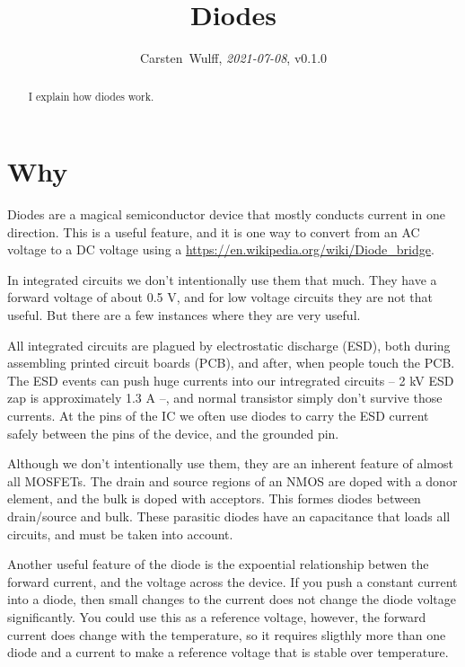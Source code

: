 \documentclass[technote,10pt,a4paper]{IEEEtran}
\begin{document}

\title{Diodes}
\author{Carsten~Wulff, \textit{2021-07-08}, v0.1.0 }
\maketitle

\begin{abstract}
I explain how diodes work.
\end{abstract}

\section{Why}
Diodes are a magical semiconductor device that mostly conducts current in one
direction. This is a useful feature, and it is one way to convert from an AC
voltage to a DC voltage using a
\url{https://en.wikipedia.org/wiki/Diode_bridge}.

In integrated circuits we don't intentionally use them that much. They have a forward voltage
of about 0.5 V, and for low voltage circuits they are not that useful. But there
are a few instances where they are very useful.

All integrated circuits are plagued by electrostatic discharge (ESD), both during
assembling printed circuit boards (PCB), and after, when people touch the PCB.
The ESD events can push huge currents into our intregrated circuits -- 2 kV ESD
zap is approximately 1.3 A --, and normal transistor simply don't survive those
currents. At the pins of the IC we often use diodes to carry the ESD current
safely between the pins of the device, and the grounded pin.

Although we don't intentionally use them, they are an inherent feature of almost
all MOSFETs. The drain and source regions of an NMOS are doped with a donor element, and
the bulk is doped with acceptors. This formes diodes between drain/source and
bulk. These parasitic diodes have an capacitance that loads all circuits, and
must be taken into account.

Another useful feature of the diode is the expoential relationship betwen the
forward current, and the voltage across the device. If you push a constant
current into a diode, then small changes to the current does not change the
diode voltage significantly. You could use this as a reference voltage, however,
the forward current does change with the temperature, so it requires sligthly
more than one diode and a current to make a reference voltage that is stable over temperature.
\end{document}
